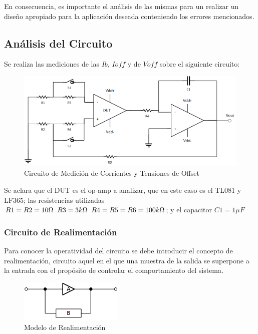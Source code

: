 En consecuencia, es importante el análisis de las mismas para un realizar un diseño apropiado para la aplicación deseada conteniendo los errores mencionados. 

\vspace{3cm}

\subsection{Análisis del Circuito}

Se realiza las mediciones de las $Ib$, $Ioff$ y de $Voff$ sobre el siguiente circuito:

\begin{figure}[h]
    \centering
    \includegraphics[scale = 0.65]{circuito.png}
    \caption{Circuito de Medición de Corrientes y Tensiones de Offset}
    \label{ej2cir}
\end{figure}

Se aclara que el DUT es el op-amp a analizar, que en este caso es el TL081 y LF365; las resistencias utilizadas $R1 = R2 = 10\Omega \hspace{0.2cm} R3 = 3k\Omega \hspace{0.2cm} R4 = R5 = R6 = 100k\Omega$; y el capacitor $C1 = 1\mu F$

\subsubsection{Circuito de Realimentación}

Para conocer la operatividad del circuito se debe introducir el concepto de realimentación, circuito aquel en el que una muestra de la salida se superpone a la entrada con el propósito de controlar el comportamiento del sistema. 

\begin{figure}[h]
    \centering
    \includegraphics[scale = 1.5]{realimentacion.png}
    \caption{Modelo de Realimentación}
    \label{ej2reali}
\end{figure}

